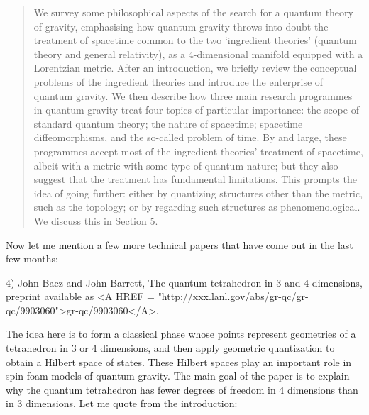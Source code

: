\begin{quote}
We survey some philosophical aspects of the search for a quantum theory
of gravity, emphasising how quantum gravity throws into doubt the
treatment of spacetime common to the two `ingredient theories' (quantum
theory and general relativity), as a 4-dimensional manifold equipped
with a Lorentzian metric.  After an introduction, we briefly review the
conceptual problems of the ingredient theories and introduce the
enterprise of quantum gravity.  We then describe how three main research
programmes in quantum gravity treat four topics of particular
importance: the scope of standard quantum theory; the nature of
spacetime; spacetime diffeomorphisms, and the so-called problem of time.
By and large, these programmes accept most of the ingredient theories'
treatment of spacetime, albeit with a metric with some type of quantum
nature; but they also suggest that the treatment has fundamental
limitations.  This prompts the idea of going further: either by
quantizing structures other than the metric, such as the topology; or by
regarding such structures as phenomenological.  We discuss this in
Section 5.
\end{quote}
    

Now let me mention a few more technical papers that have come out in
the last few months:

4) John Baez and John Barrett, The quantum tetrahedron in 3
and 4 dimensions, preprint available as 
<A HREF = "http://xxx.lanl.gov/abs/gr-qc/gr-qc/9903060">gr-qc/9903060</A>.

The idea here is to form a classical phase whose points represent
geometries of a tetrahedron in 3 or 4 dimensions, and then apply
geometric quantization to obtain a Hilbert space of states.  These
Hilbert spaces play an important role in spin foam models of quantum
gravity.  The main goal of the paper is to explain why the quantum
tetrahedron has fewer degrees of freedom in 4 dimensions than in 3
dimensions.  Let me quote from the introduction:


